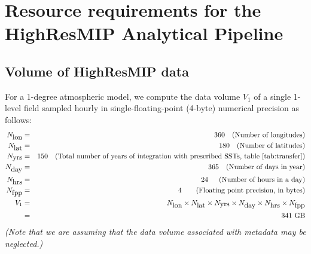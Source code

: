 \documentclass[11pt]{article}
\begin{document}
\section{Resource requirements for the HighResMIP Analytical Pipeline}
\label{sec:requirements}
\subsection{Volume of HighResMIP data}
\label{ssec:rawstorage}

For a 1-degree atmospheric model, we compute the data volume $V_1$ of a single 1-level field sampled hourly in single-floating-point (4-byte) numerical precision as follows:
\begin{eqnarray*}
N_{\hbox{lon}} & = & 360 \quad \hbox{(Number of longitudes)} \\
N_{\hbox{lat}} & = & 180 \quad \hbox{(Number of latitudes)} \\
N_{\hbox{yrs}} & = & 150 \quad \hbox{(Total number of years of integration with prescribed SSTs, table~\ref{tab:transfer})} \\
N_{\hbox{day}} & = & 365 \quad \hbox{(Number of days in year)} \\
N_{\hbox{hrs}} & = & 24\phantom{9} \quad \hbox{(Number of hours in a day)} \\
N_{\hbox{fpp}} & = & 4\phantom{99} \quad \hbox{(Floating point precision, in bytes)} \\
V_1 & = & N_{\hbox{lon}} \times N_{\hbox{lat}} \times N_{\hbox{yrs}} \times N_{\hbox{day}} \times N_{\hbox{hrs}} \times N_{\hbox{fpp}} \\
& = & 341\ \hbox{GB}
\end{eqnarray*}
{\textit{(Note that we are assuming that the data volume associated with metadata may be neglected.)}}
\end{document}
